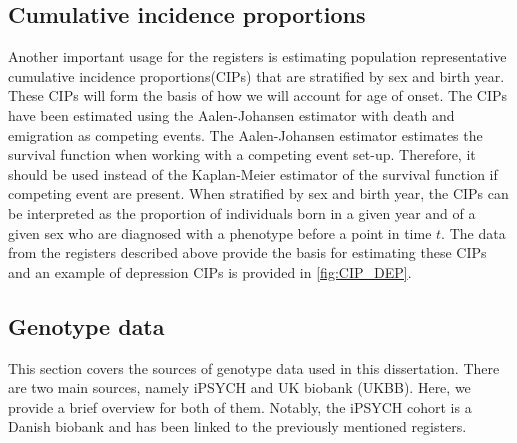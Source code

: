 \subsection{Cumulative incidence proportions} \label{sec:CIPs}
Another important usage for the registers is estimating population representative cumulative incidence proportions(CIPs) that are stratified by sex and birth year. These CIPs will form the basis of how we will account for age of onset. The CIPs have been estimated using the Aalen-Johansen estimator\cite{hansen2017estimating} with death and emigration as competing events. The Aalen-Johansen estimator estimates the survival function when working with a competing event set-up. Therefore, it should be used instead of the Kaplan-Meier estimator of the survival function if competing event are present. When stratified by sex and birth year, the CIPs can be interpreted as the proportion of individuals born in a given year and of a given sex who are diagnosed with a phenotype before a point in time $ t $. The data from the registers described above provide the basis for estimating these CIPs and an example of depression CIPs is provided in \cref{fig:CIP_DEP}.


\subsection{Genotype data}
This section covers the sources of genotype data used in this dissertation. There are two main sources, namely iPSYCH and UK biobank (UKBB). Here, we provide a brief overview for both of them. Notably, the iPSYCH cohort is a Danish biobank and has been linked to the previously mentioned registers. 


